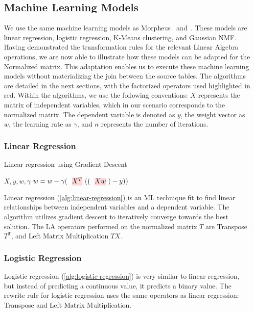 \subsection{Machine Learning Models}
We use the same machine learning models as Morpheus~\cite{morpheus} and~\cite{amalur_tkde24}. These models are linear regression, logistic regression, K-Means clustering, and Gaussian NMF. Having demonstrated the transformation rules for the relevant Linear Algebra operations, we are now able to illustrate how these models can be adapted for the Normalized matrix. This adaptation enables us to execute these machine learning models without materializing the join between the source tables. The algorithms are detailed in the next sections, with the factorized operators used highlighted in red. Within the algorithms, we use the following conventions: $X$ represents the matrix of independent variables, which in our scenario corresponds to the normalized matrix. The dependent variable is denoted as $y$, the weight vector as $w$, the learning rate as $\gamma$, and $n$ represents the number of iterations.

\subsubsection{Linear Regression}
\begin{algorithm}[ht!]
  \caption[Linear regression]{Linear regression using Gradient Descent
    ~\cite{morpheus}}\label{alg:linear-regression}
  \begin{algorithmic}
    \Require $X, y , w, \gamma$
    \State $w = w - \gamma (\text{\red{$X^T$}}((\text{\red{$X w$}}) - y))$
    \EndFor
  \end{algorithmic}
\end{algorithm}
Linear regression (\autoref{alg:linear-regression}) is an ML technique fit to find linear relationships between independent variables and a dependent variable. The algorithm utilizes gradient descent to iteratively converge towards the best solution. The LA operators performed on the normalized matrix $T$ are Transpose $T^T$, and Left Matrix Multiplication $TX$.

\subsubsection{Logistic Regression}
Logistic regression (\autoref{alg:logistic-regression}) is very similar to linear regression, but instead of predicting a continuous value, it predicts a binary value. The rewrite rule for logistic regression uses the same operators as linear regression: Transpose and Left Matrix Multiplication.

